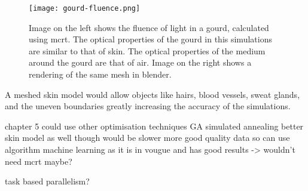 \begin{figure}[!htpb]
    \centering
    \texttt{[image: gourd-fluence.png]}
    \caption{Image on the left shows the fluence of light in a gourd, calculated using \gls*{mcrt}. The optical properties of the gourd in this simulations are similar to that of skin. The optical properties of the medium around the gourd are that of air. Image on the right shows a rendering of the same mesh in blender.}
    \label{fig:mesh}
\end{figure}

A meshed skin model would allow objects like hairs, blood vessels, sweat glands, and the uneven boundaries greatly increasing the accuracy of the simulations.

chapter 5 could use other optimisation techniques GA simulated annealing
better skin model as well though would be slower
more good quality data so can use algorithm
machine learning as it is in vougue and has good results -> wouldn't need mcrt maybe?

task based parallelism?